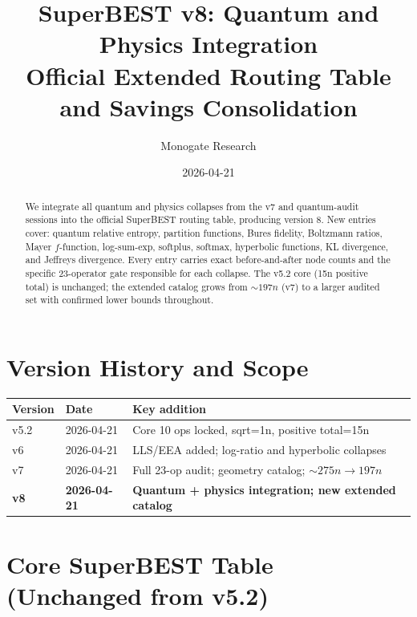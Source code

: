 \documentclass[11pt]{article}
\title{SuperBEST v8: Quantum and Physics Integration\\
Official Extended Routing Table and Savings Consolidation}
\author{Monogate Research}
\date{2026-04-21}
\begin{document}
\maketitle

\begin{abstract}
We integrate all quantum and physics collapses from the v7 and quantum-audit sessions
into the official SuperBEST routing table, producing version 8.
New entries cover: quantum relative entropy, partition functions, Bures fidelity,
Boltzmann ratios, Mayer $f$-function, log-sum-exp, softplus, softmax, hyperbolic functions,
KL divergence, and Jeffreys divergence.
Every entry carries exact before-and-after node counts and the specific 23-operator
gate responsible for each collapse.
The v5.2 core (15n positive total) is unchanged;
the extended catalog grows from $\sim197n$ (v7) to a larger audited set with
confirmed lower bounds throughout.
\end{abstract}

\section{Version History and Scope}

\begin{center}
\begin{tabular}{lll}
\toprule
Version & Date & Key addition \\
\midrule
v5.2 & 2026-04-21 & Core 10 ops locked, sqrt=1n, positive total=15n \\
v6   & 2026-04-21 & LLS/EEA added; log-ratio and hyperbolic collapses \\
v7   & 2026-04-21 & Full 23-op audit; geometry catalog; $\sim275n\to197n$ \\
\textbf{v8}   & \textbf{2026-04-21} & \textbf{Quantum + physics integration; new extended catalog} \\
\bottomrule
\end{tabular}
\end{center}

\section{Core SuperBEST Table (Unchanged from v5.2)}
\end{document}
